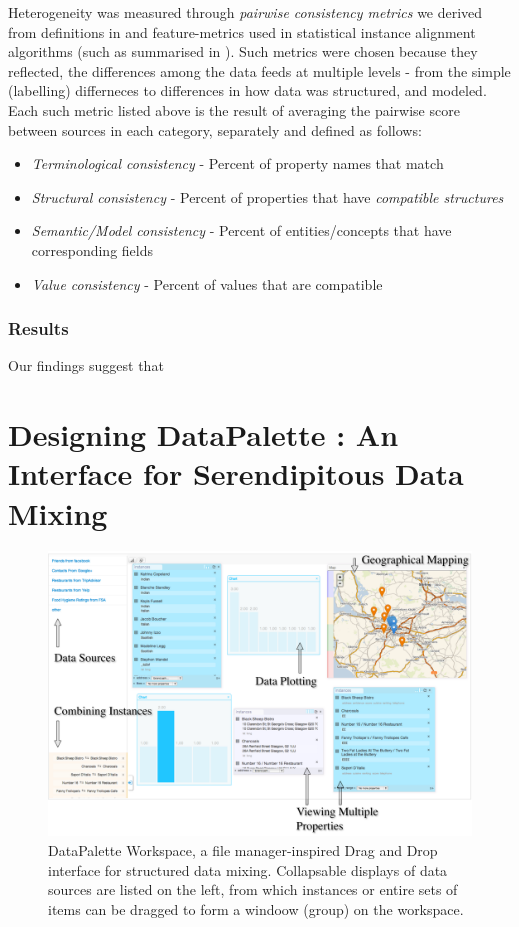 \documentclass{sigchi}
\begin{document}
Heterogeneity was measured through \emph{pairwise consistency metrics} we derived from definitions in \cite{george2005understanding} and feature-metrics used in statistical instance alignment algorithms (such as summarised in \cite{bhattacharya2007collective}). Such metrics were chosen because they reflected, the differences among the data feeds at multiple levels - from the simple (labelling) differneces to differences in how data was structured, and modeled. Each such metric listed above is the result of averaging the pairwise score between sources in each category, separately and defined as follows:

\begin{itemize}
\item \emph{Terminological consistency} - Percent of property names that match
\item \emph{Structural consistency} - Percent of properties that have \emph{compatible structures}
\item \emph{Semantic/Model consistency} - Percent of entities/concepts that have corresponding fields 
\item \emph{Value consistency} - Percent of values that are compatible
\end{itemize}

\subsubsection{Results}
Our findings suggest that 

\section{Designing DataPalette : An Interface for Serendipitous Data Mixing}
\begin{figure}[htbp]
\begin{center}
\includegraphics[width=18cm]{img/screenshot}
\caption{DataPalette Workspace, a file manager-inspired Drag and Drop interface for structured data mixing. Collapsable displays of data sources are listed on the left, from which instances or entire sets of items can be dragged to form a windoow (group) on the workspace.}
\label{fig:workspace}
\end{center}
\end{figure}
\end{document}
